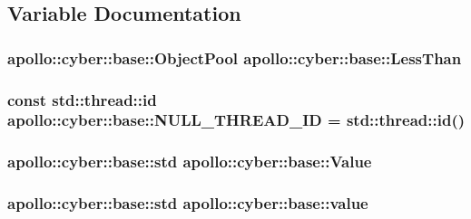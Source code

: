 \subsection{Variable Documentation}
\hypertarget{namespaceapollo_1_1cyber_1_1base_ad32e38dcf7a608eb308aa87dea50371b}{
\subsubsection[{Less\-Than}]{\setlength{\rightskip}{0pt plus 5cm} {\bf apollo\-::cyber\-::base\-::\-Object\-Pool} apollo\-::cyber\-::base\-::\-Less\-Than}}\label{namespaceapollo_1_1cyber_1_1base_ad32e38dcf7a608eb308aa87dea50371b}
\hypertarget{namespaceapollo_1_1cyber_1_1base_a3aa2d654ab213ffe2d37fd81e951094b}{
\subsubsection[{N\-U\-L\-L\-\_\-\-T\-H\-R\-E\-A\-D\-\_\-\-I\-D}]{\setlength{\rightskip}{0pt plus 5cm}const std\-::thread\-::id apollo\-::cyber\-::base\-::\-N\-U\-L\-L\-\_\-\-T\-H\-R\-E\-A\-D\-\_\-\-I\-D = std\-::thread\-::id()\hspace{0.3cm}{\ttfamily [static]}}}\label{namespaceapollo_1_1cyber_1_1base_a3aa2d654ab213ffe2d37fd81e951094b}
\hypertarget{namespaceapollo_1_1cyber_1_1base_a432d881d5e97cf8bbb7a30004a232dbf}{
\subsubsection[{Value}]{\setlength{\rightskip}{0pt plus 5cm} {\bf apollo\-::cyber\-::base\-::std} apollo\-::cyber\-::base\-::\-Value}}\label{namespaceapollo_1_1cyber_1_1base_a432d881d5e97cf8bbb7a30004a232dbf}
\hypertarget{namespaceapollo_1_1cyber_1_1base_aa3e2fff9b18a1214af4a70546fb7120f}{
\subsubsection[{value}]{\setlength{\rightskip}{0pt plus 5cm} {\bf apollo\-::cyber\-::base\-::std} apollo\-::cyber\-::base\-::value}}\label{namespaceapollo_1_1cyber_1_1base_aa3e2fff9b18a1214af4a70546fb7120f}
